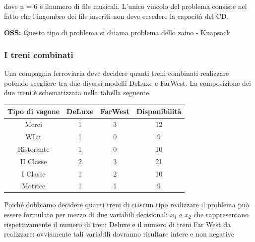 \documentclass[a4paper, 11pt]{article}
\begin{document}
            dove n = 6 è ilnumero di file musicali. L’unico vincolo del problema consiste nel fatto che l’ingombro dei file inseriti non deve eccedere la capacità del CD.

            \textbf{OSS: } Questo tipo di problema si chiama problema dello zaino - Knapsack

        
            \subsubsection*{I treni combinati}
            Una compagnia ferroviaria deve decidere quanti treni combinati realizzare potendo scegliere tra due diversi modelli DeLuxe e FarWest. La composizione dei due treni è schematizzata nella tabella seguente.

            \begin{table}[ht]
                \centering
                \begin{tabular}{|c|c|c|c|}
                \hline
                \textbf{Tipo di vagone} & \textbf{DeLuxe} & \textbf{FarWest} & \textbf{Disponibilità} \\ \hline
                Merci                   & 1               & 3                & 12                     \\ 
                WLit                    & 1               & 0                & 9                      \\ 
                Ristorante              & 1               & 0                & 10                     \\ 
                II Classe               & 2               & 3                & 21                     \\ 
                I Classe                & 1               & 2                & 10                     \\ 
                Motrice                 & 1               & 1                & 9                      \\ \hline
                \end{tabular}
            \end{table}

            Poiché dobbiamo decidere quanti treni di ciascun tipo realizzare il problema può essere formulato per mezzo di due variabili decisionali $x_1$ e $x_2$ che rappresentano rispettivamente il numero di treni Deluxe e il numero di treni Far West da realizzare: ovviamente tali variabili dovranno risultare intere e non negative
\end{document}
